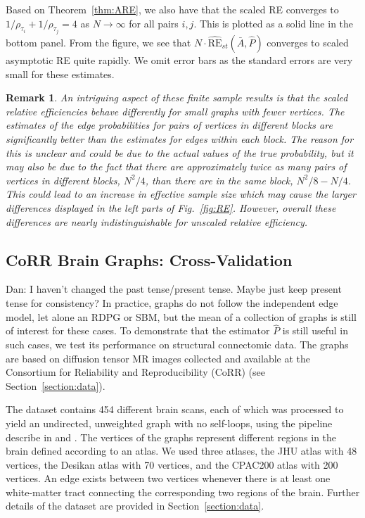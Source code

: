 \documentclass[10pt,letterpaper]{article}
\newtheorem{remark}[fact]{Remark}
\renewcommand{\hat}{\widehat}
\begin{document}
Based on Theorem~\ref{thm:ARE}, we also have that the scaled RE converges to $1/\rho_{\tau_i}+1/\rho_{\tau_j}=4$ as $N\to\infty$ for all pairs $i,j$.
This is plotted as a solid line in the bottom panel.
From the figure, we see that $N \cdot \hat{\mathrm{RE}}_{st}(\bar{A}, \hat{P})$ converges to scaled asymptotic RE quite rapidly.
We omit error bars as the standard errors are very small for these estimates.

\begin{remark}
An intriguing aspect of these finite sample results is that the scaled relative efficiencies behave differently for small graphs with fewer vertices. 
The estimates of the edge probabilities for pairs of vertices in different blocks are significantly better than the estimates for edges within each block.
The reason for this is unclear and could be due to the actual values of the true probability, but it may also be due to the fact that there are approximately twice as many pairs of vertices in different blocks, $N^2/4$, than there are in the same block, $N^2/8-N/4$.
This could lead to an increase in effective sample size which may cause the larger differences displayed in the left parts of Fig.~\ref{fig:RE}.
However, overall these differences are nearly indistinguishable for unscaled relative efficiency.
\end{remark}


\subsection{CoRR Brain Graphs: Cross-Validation}\label{sec:corr_data}
{\color{red} Dan: I haven't changed the past tense/present tense. Maybe just keep present tense for consistency?}
In practice, graphs do not follow the independent edge model, let alone an RDPG or SBM, but the mean of a collection of graphs is still of interest for these cases.
To demonstrate that the estimator $\hat{P}$ is still useful in such cases, we test its performance on structural connectomic data. 
The graphs are based on diffusion tensor MR images collected and available at the Consortium for Reliability and Reproducibility (CoRR) \cite{zuo2014open, gorgolewski2015high} (see Section~\ref{section:data}).

The dataset contains 454 different brain scans, each of which was processed to yield an undirected, unweighted graph with no self-loops, using the pipeline describe in \cite{gray2013migraine} and \cite{kiar2016m2g}.
The vertices of the graphs represent different regions in the brain defined according to an atlas.
We used three atlases, the JHU atlas with 48 vertices, the Desikan atlas with 70 vertices, and the  CPAC200 atlas with 200 vertices.
An edge exists between two vertices whenever there is at least one white-matter tract connecting the corresponding two regions of the brain. 
Further details of the dataset are provided in Section~\ref{section:data}.
\end{document}
